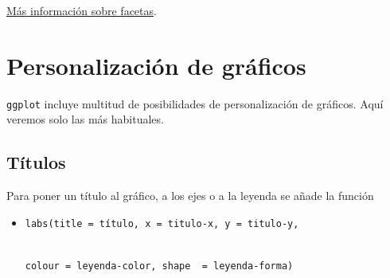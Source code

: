 \documentclass[
  a4paper,
]{scrreport}
\providecommand{\tightlist}{%
  \setlength{\itemsep}{0pt}\setlength{\parskip}{0pt}}\usepackage{longtable,booktabs,array}
\theoremstyle{definition}
\theoremstyle{definition}
\theoremstyle{remark}
\begin{document}
\href{https://ggplot2.tidyverse.org/reference/facet_wrap.html?q=facet_wrap}{Más
información sobre facetas}.

\section{Personalización de
gráficos}\label{personalizaciuxf3n-de-gruxe1ficos}

\texttt{ggplot} incluye multitud de posibilidades de personalización de
gráficos. Aquí veremos solo las más habituales.

\subsection{Títulos}\label{tuxedtulos}

Para poner un título al gráfico, a los ejes o a la leyenda se añade la
función

\begin{itemize}
\tightlist
\item
  \texttt{labs(title\ =\ título,\ x\ =\ titulo-x,\ y\ =\ titulo-y,}\strut \\
  \texttt{colour\ =\ leyenda-color,\ shape\ \ =\ leyenda-forma)}
\end{itemize}
\end{document}
